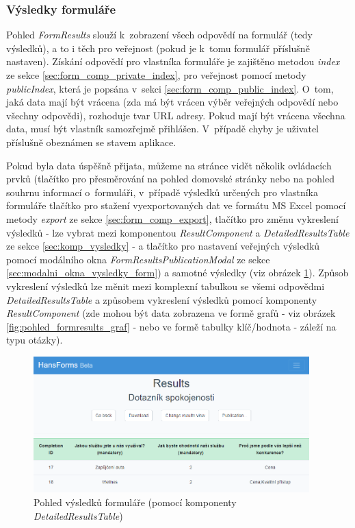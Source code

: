 		\subsubsection{Výsledky formuláře}\label{sec:pohled_vysledky_formulare} %
		Pohled \textit{FormResults} slouží k~zobrazení všech odpovědí na formulář (tedy výsledků), a to i těch pro veřejnost (pokud je k~tomu formulář příslušně nastaven). Získání odpovědí pro vlastníka formuláře je zajištěno metodou \textit{index} ze sekce \ref{sec:form_comp_private_index}, pro veřejnost pomocí metody \textit{publicIndex}, která je popsána v~sekci \ref{sec:form_comp_public_index}. O~tom, jaká data mají být vrácena (zda má být vrácen výběr veřejných odpovědí nebo všechny odpovědi), rozhoduje tvar URL adresy. Pokud mají být vrácena všechna data, musí být vlastník samozřejmě přihlášen. V~případě chyby je uživatel příslušně obeznámen se stavem aplikace.
		
		Pokud byla data úspěšně přijata, můžeme na stránce vidět několik ovládacích prvků (tlačítko pro přesměrování na pohled domovské stránky nebo na pohled souhrnu informací o~formuláři, v~případě výsledků určených pro vlastníka formuláře tlačítko pro stažení vyexportovaných dat ve formátu MS Excel pomocí metody \textit{export} ze sekce \ref{sec:form_comp_export}, tlačítko pro změnu vykreslení výsledků - lze vybrat mezi komponentou \textit{ResultComponent} a \textit{DetailedResultsTable} ze sekce \ref{sec:komp_vysledky} - a tlačítko pro nastavení veřejných výsledků pomocí modálního okna \textit{FormResultsPublicationModal} ze sekce \ref{sec:modalni_okna_vysledky_form}) a samotné výsledky (viz obrázek \ref{fig:pohled_formresults}). Způsob vykreslení výsledků lze měnit mezi komplexní tabulkou se všemi odpovědmi \textit{DetailedResultsTable} a způsobem vykreslení výsledků  pomocí komponenty \textit{ResultComponent} (zde mohou být data zobrazena ve formě grafů - viz obrázek \ref{fig:pohled_formresults_graf} - nebo ve formě tabulky klíč/hodnota - záleží na typu otázky).
		
		\begin{figure}[h]
			\centering
			\includegraphics[width=0.95\textwidth]{img/pohledy/formresults.png}
			\caption{Pohled výsledků formuláře (pomocí komponenty \textit{DetailedResultsTable})}
			\label{fig:pohled_formresults}
		\end{figure}
	
